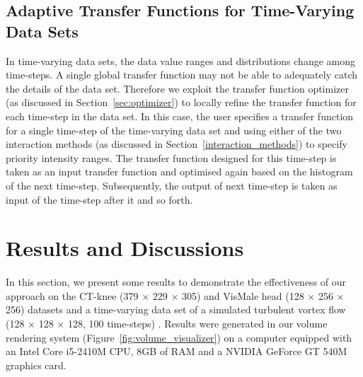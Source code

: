 
\subsection{Adaptive Transfer Functions for Time-Varying Data Sets}
In time-varying data sets, the data value ranges and distributions change among time-steps. A single global transfer function may not be able to adequately catch the details of the data set.
Therefore we exploit the transfer function optimizer (as discussed in Section~\ref{sec:optimizer}) to locally refine the transfer function for each time-step in the data set.
In this case, the user specifies a transfer function for a single time-step of the time-varying data set and using either of the two interaction methods (as discussed in Section~\ref{interaction_methods}) to specify priority intensity ranges.
The transfer function designed for this time-step is taken as an input transfer function and optimised again based on the histogram of the next time-step. Subsequently, the output of next time-step is taken as input of the time-step after it and so forth.

\section{Results and Discussions}
In this section, we present some results to demonstrate the effectiveness of our approach on the CT-knee (379 $ \times $ 229 $ \times $ 305) and VisMale head (128 $ \times $ 256 $ \times $ 256) datasets \cite{website:Roettger_volume_2013} and a time-varying data set of a simulated turbulent vortex flow (128 $\times$ 128 $\times$ 128, 100 time-steps) \cite{ma_high_2000}.
Results were generated in our volume rendering system (Figure~\ref{fig:volume_visualizer}) on a computer equipped with an Intel Core i5-2410M CPU, 8GB of RAM and a NVIDIA GeForce GT 540M graphics card.

